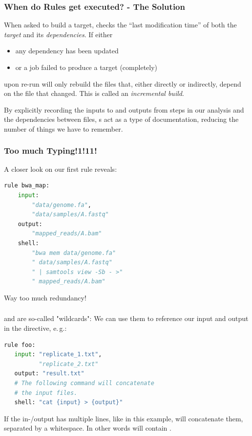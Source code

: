 \begin{frame}
  \frametitle{When do Rules get executed? - The Solution}
  When asked to build a target, \Snakemake{} checks the “last modification time” of both the \emph{target} and its \emph{dependencies}.
  If either
  \begin{itemize}
   \item any dependency has been updated
   \item or a job failed to produce a target (completely)
  \end{itemize}
  upon re-run \Snakemake{} will only rebuild the files that, either directly or indirectly, depend on the file that changed. This is called an \emph{incremental build}.
  \pause
  \begin{docs}
  	By explicitly recording the inputs to and outputs from steps in our analysis and the dependencies between files, s act as a type of documentation, reducing the number of things we have to remember.
  \end{docs}
\end{frame}

\begin{frame}[fragile]
  \frametitle{Too much Typing!1!11!}
  A closer look on our first rule reveals:
  \begin{lstlisting}[language=Python,style=Python]
rule bwa_map:
    input:
        "data/genome.fa",
        "data/samples/A.fastq"
    output:
        "mapped_reads/A.bam"
    shell:
        "bwa mem data/genome.fa"
        " data/samples/A.fastq"
        " | samtools view -Sb - >"
        " mapped_reads/A.bam"
    \end{lstlisting}
    \bcattention Way too much redundancy!
\end{frame}

\begin{frame}[fragile]
	\frametitle{}
	 and  are so-called "wildcards": We can use them 
	to reference our input and output in the  directive, e.\,g.:
	\begin{lstlisting}[language=Python,style=Python]
rule foo:
   input: "replicate_1.txt",
          "replicate_2.txt"
   output: "result.txt"
   # The following command will concatenate
   # the input files.
   shell: "cat {input} > {output}"
    \end{lstlisting}
    \begin{docs}
      If the in-/output has multiple lines, like in this example, \Snakemake{} will concatenate them, separated by a whitespace. In other words  will contain .
    \end{docs}
\end{frame}

